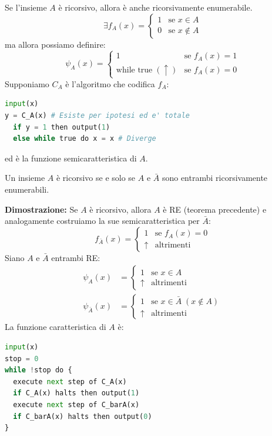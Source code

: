 \documentclass[a4paper]{article}
\begin{document}
\begin{theorem}
  Se l'insieme \( A \) è ricorsivo, allora è anche ricorsivamente enumerabile.
  \[
    \exists f_A(x) =
    \begin{cases}
      1 & \text{se } x \in A \\
      0 & \text{se } x \notin A
    \end{cases}
  \] 
  ma allora possiamo definire:
  \[
    \psi_A(x) =
    \begin{cases}
      1 & \text{se } f_A(x) = 1 \\
      \text{while true}\;(\uparrow) & \text{se } f_A(x) = 0 
    \end{cases}
  \] 
  Supponiamo \( C_A \) è l'algoritmo che codifica \( f_A \):
\begin{lstlisting}[language=Python]
input(x)
y = C_A(x) # Esiste per ipotesi ed e' totale
  if y = 1 then output(1)
  else while true do x = x # Diverge
\end{lstlisting}
  ed è la funzione semicaratteristica di \( A \).
\end{theorem}

\vspace{1em}
\noindent
\begin{theorem}
  Un insieme \( A \) è ricorsivo se e solo se \( A \) e \( \bar{A} \) sono entrambi 
  ricorsivamente enumerabili.

  \vspace{1em}
  \noindent
  \textbf{Dimostrazione:} Se \( A \) è ricorsivo, allora \( A \) è RE (teorema precedente) e
  analogamente costruiamo la sue semicaratteristica per \( \bar{A} \):
  \[
    f_{\bar{A}}(x) =
    \begin{cases}
      1 & \text{se } f_A(x) = 0 \\
      \uparrow & \text{altrimenti}
    \end{cases}
  \] 
  Siano \( A \) e \( \bar{A} \) entrambi RE:
  \[
    \begin{aligned}
      \psi_A(x) &=
      \begin{cases}
        1 & \text{se } x \in A \\
        \uparrow & \text{altrimenti}
      \end{cases}\\
      \psi_{\bar{A}}(x) &=
      \begin{cases}
        1 & \text{se } x \in \bar{A} \; (x \notin A) \\
        \uparrow & \text{altrimenti}
      \end{cases}
    \end{aligned}
  \] 
  La funzione caratteristica di \( A \) è:
\begin{lstlisting}[language=Python]
input(x)
stop = 0
while !stop do {
  execute next step of C_A(x)
  if C_A(x) halts then output(1)
  execute next step of C_barA(x)
  if C_barA(x) halts then output(0)
}
\end{lstlisting}
\end{theorem}
\end{document}
